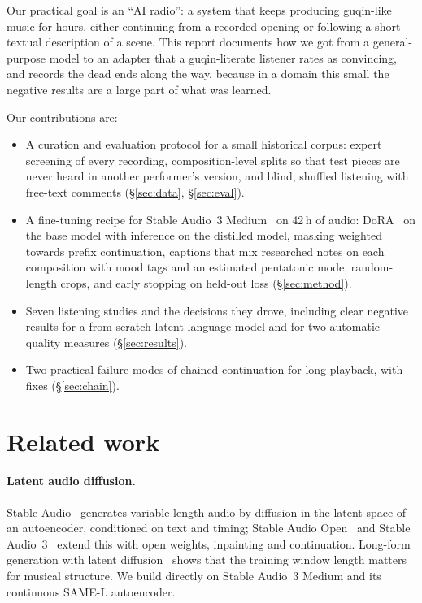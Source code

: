 \documentclass[11pt]{article}
\begin{document}
Our practical goal is an ``AI radio'': a system that keeps producing guqin-like music for hours, either continuing
from a recorded opening or following a short textual description of a scene. This report documents how we got
from a general-purpose model to an adapter that a guqin-literate listener rates as convincing, and records the
dead ends along the way, because in a domain this small the negative results are a large part of what was learned.

Our contributions are:
\begin{itemize}
  \item A curation and evaluation protocol for a small historical corpus: expert screening of every recording,
        composition-level splits so that test pieces are never heard in another performer's version, and blind,
        shuffled listening with free-text comments (\S\ref{sec:data}, \S\ref{sec:eval}).
  \item A fine-tuning recipe for Stable Audio~3 Medium~\citep{evans2026stableaudio3} on 42\,h of audio:
        DoRA~\citep{liu2024dora} on the base model with inference on the distilled model, masking weighted towards
        prefix continuation, captions that mix researched notes on each composition with mood tags and an estimated
        pentatonic mode, random-length crops, and early stopping on held-out loss (\S\ref{sec:method}).
  \item Seven listening studies and the decisions they drove, including clear negative results for a
        from-scratch latent language model and for two automatic quality measures (\S\ref{sec:results}).
  \item Two practical failure modes of chained continuation for long playback, with fixes (\S\ref{sec:chain}).
\end{itemize}

\section{Related work}

\paragraph{Latent audio diffusion.} Stable Audio~\citep{evans2024fast} generates variable-length audio by
diffusion in the latent space of an autoencoder, conditioned on text and timing; Stable Audio
Open~\citep{evans2024open} and Stable Audio~3~\citep{evans2026stableaudio3} extend this with open weights,
inpainting and continuation. Long-form generation with latent diffusion~\citep{evans2024longform} shows that
the training window length matters for musical structure. We build directly on Stable Audio~3 Medium and its
continuous SAME-L autoencoder.
\end{document}
